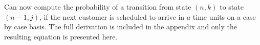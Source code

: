 Can now compute the probability of a transition from state $(n, k)$ to state $(n - 1, j)$, if the next customer is scheduled to arrive in $a$ time units on a case by case basis. The full derivation is included in the appendix and only the resulting equation is presented here.












































